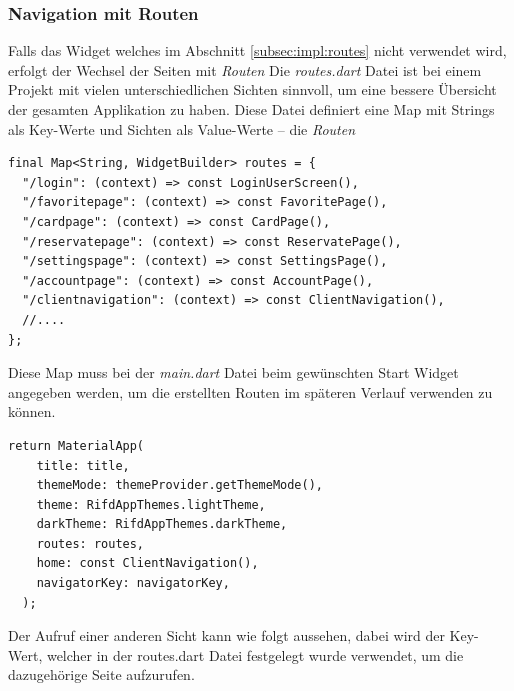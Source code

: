 \subsubsection{Navigation mit Routen}\label{subsubsec:routes}
Falls das Widget welches im Abschnitt \ref{subsec:impl:routes}  nicht verwendet wird, erfolgt der Wechsel der Seiten mit {\textit{Routen}}
Die {\textit{routes.dart}} Datei ist bei einem Projekt mit vielen unterschiedlichen Sichten sinnvoll, um eine bessere Übersicht der gesamten Applikation zu haben. Diese Datei definiert eine Map mit Strings als Key-Werte und Sichten als Value-Werte – die {\textit{Routen}}

\begin{lstlisting}[caption=routes.dart Datei für die User Sicht,style=goMono]
final Map<String, WidgetBuilder> routes = {
  "/login": (context) => const LoginUserScreen(),
  "/favoritepage": (context) => const FavoritePage(),
  "/cardpage": (context) => const CardPage(),
  "/reservatepage": (context) => const ReservatePage(),
  "/settingspage": (context) => const SettingsPage(),
  "/accountpage": (context) => const AccountPage(),
  "/clientnavigation": (context) => const ClientNavigation(),
  //....
};
\end{lstlisting}

Diese Map muss bei der {\textit{main.dart}} Datei beim gewünschten Start Widget angegeben werden, um die erstellten Routen im späteren Verlauf verwenden zu können.

\begin{lstlisting}[caption=Angeben der Routen im Wurzelknoten,style=goMono]
return MaterialApp(
    title: title,
    themeMode: themeProvider.getThemeMode(),
    theme: RifdAppThemes.lightTheme,
    darkTheme: RifdAppThemes.darkTheme,
    routes: routes,
    home: const ClientNavigation(),
    navigatorKey: navigatorKey,
  ); 
\end{lstlisting}

Der Aufruf einer anderen Sicht kann wie folgt aussehen, dabei wird der Key-Wert, welcher in der routes.dart Datei festgelegt wurde verwendet, um die dazugehörige Seite aufzurufen.

